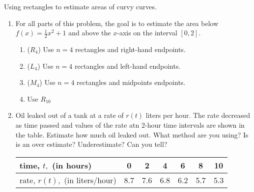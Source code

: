 \documentclass[11pt,fleqn]{article}
\begin{document}
\vspace*{-0.7in}

\begin{center}
  \Large{}
  \end{center}
Using rectangles to estimate areas of curvy curves.\\

\begin{enumerate}
\item For all parts of this problem, the goal is to estimate the area below $f(x) =\frac{1}{2}x^2+1$ and above the $x$-axis on the interval $[0,2].$\\
	\begin{enumerate}
	\item ($R_4$) Use $n=4$ rectangles and right-hand endpoints.
	\vfill
	\item ($L_4$) Use $n=4$ rectangles and left-hand endpoints.
	\vfill
	\item ($M_4$) Use $n=4$ rectangles and midpoints endpoints.
	\vfill
	\newpage
	\item Use $R_{10}$
	\vfill
	\end{enumerate}
\item Oil leaked out of a tank at a rate of $r(t)$ liters per hour. The rate decreased as time passed and values of the rate atn 2-hour time intervals are shown in the table. Estimate how much oil leaked out. What method are you using? Is is an over estimate? Underestimate? Can you tell?
\begin{center}
\begin{tabular}{ | l | c|c|c|c|c|c|}
\hline
time, $t,$ (in hours) & 0&2&4&6&8&10\\
\hline
rate, $r(t),$ (in liters/hour)&8.7&7.6&6.8&6.2&5.7&5.3\\
\hline
\end{tabular}
\end{center}
\vfill	
\end{enumerate}
\end{document}
